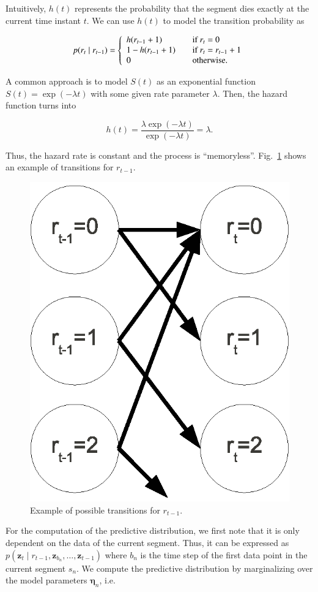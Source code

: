 Intuitively, $h(t)$ represents the probability that the segment dies exactly at
the current time instant $t$. We can use $h(t)$ to model the transition
probability as

\begin{equation}
\label{eqn:transprob}
p(r_t\mid r_{t-1}) = \left\{
\begin{array}{l l}
h(r_{t-1}+1) & \quad \text{if $r_t=0$ }\\
1 - h(r_{t-1}+1) & \quad \text{if $r_t=r_{t-1}+1$}\\
0 & \quad \text{otherwise}.
\end{array} \right.
\end{equation}

A common approach is to model $S(t)$ as an exponential function
$S(t)=\exp(-\lambda t)$ with some given rate parameter $\lambda$. Then, the
hazard function turns into

\begin{equation}
\label{eqn:hazardexp}
h(t) = \frac{\lambda\exp(-\lambda t)}{\exp(-\lambda t)} = \lambda.
\end{equation}

Thus, the hazard rate is constant and the process is ``memoryless''.
Fig.~\ref{fig:transition} shows an example of transitions for $r_{t-1}$.

\begin{figure}[t]
\centering
\includegraphics[width=0.5\columnwidth]{fig/transition.eps}
\caption{Example of possible transitions for $r_{t-1}$.}
\label{fig:transition}
\end{figure}

For the computation of the predictive distribution, we first note that it is
only dependent on the data of the current segment. Thus, it can be expressed as
$p(\mathbf{z}_t\mid r_{t-1}, \mathbf{z}_{b_n},\dots,\mathbf{z}_{t-1})$ where
$b_n$ is the time step of the first data point in the current segment $s_n$. We
compute the predictive distribution by marginalizing over the model parameters
$\boldsymbol{\eta}_n$, i.e.

